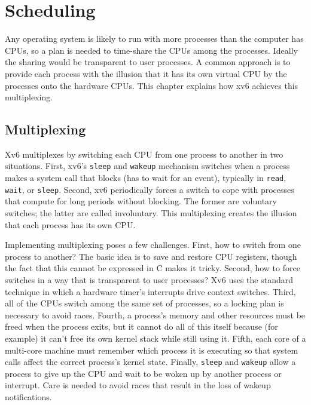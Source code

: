 % 
%  
\chapter{Scheduling}
\label{CH:SCHED}

Any operating system is likely to run with more processes than the
computer has CPUs, so a plan is needed to time-share the
CPUs among the processes. Ideally the sharing would be transparent to user
processes.  A common approach is to provide each process
with the illusion that it has its own virtual CPU by
the processes onto the hardware CPUs.
This chapter explains how xv6 achieves this multiplexing.
\section{Multiplexing}

Xv6 multiplexes by switching each CPU from one process to
another in two situations. First, xv6's
\lstinline{sleep}
and
\lstinline{wakeup}
mechanism switches when a process makes a system
call that blocks (has to wait for an event), typically in \lstinline{read},
\lstinline{wait},
or
\lstinline{sleep}.
Second, xv6 periodically forces a switch to cope with
processes that compute for long periods without blocking.
The former are voluntary switches;
the latter are called involuntary.
This multiplexing creates the illusion that
each process has its own CPU.

Implementing multiplexing poses a few challenges. First, how to switch from one
process to another? 
The basic idea is to save and restore CPU registers,
though the fact that this cannot be expressed in C makes it tricky.
Second, how to force
switches in a way that is transparent to user processes?  Xv6 uses the
standard technique in which a hardware timer's interrupts drive context switches.
Third, all of the CPUs switch among the same set of processes, so a
locking plan is necessary to avoid races. Fourth, a process's
memory and other resources must be freed when the process exits,
but it cannot do all of this itself
because (for example) it can't free its own kernel stack while still using it.
Fifth, each core of a multi-core machine must remember which
process it is executing so that system calls affect the correct
process's kernel state.
Finally,  \lstinline{sleep} and \lstinline{wakeup} allow a process to give up
the CPU and wait to be woken up by another process or interrupt.
Care is needed to avoid races that result in
the loss of wakeup notifications.

